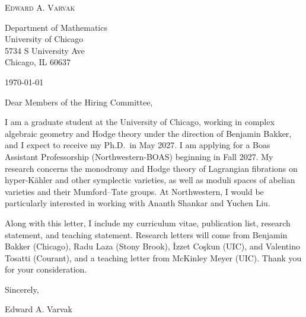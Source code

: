 \documentclass[12pt]{article}
\begin{document}
\begin{center}
  {\Large\textsc{Edward A. Varvak}}\\[10pt]
\end{center}

Department of Mathematics \\
University of Chicago \\
5734 S University Ave \\
Chicago, IL 60637

\today

Dear Members of the Hiring Committee,

I am a graduate student at the University of Chicago, working in complex
algebraic geometry and Hodge theory under the direction of Benjamin Bakker,
and I expect to receive my Ph.D.\ in May 2027. I am applying for a Boas
Assistant Professorship (\mbox{Northwestern-BOAS}) beginning in Fall 2027. My
research concerns the monodromy and Hodge theory of Lagrangian fibrations on
hyper-K\"ahler and other symplectic varieties, as well as moduli spaces of
abelian varieties and their Mumford--Tate groups. At Northwestern, I would be
particularly interested in working with Ananth Shankar and Yuchen Liu.

Along with this letter, I include my curriculum vitae, publication list,
research statement, and teaching statement. Research letters will come from
Benjamin Bakker (Chicago), Radu Laza (Stony Brook), \.{I}zzet Co\c{s}kun
(UIC), and Valentino Tosatti (Courant), and a teaching letter from McKinley
Meyer (UIC). Thank you for your consideration.

Sincerely,

Edward A. Varvak
\end{document}
